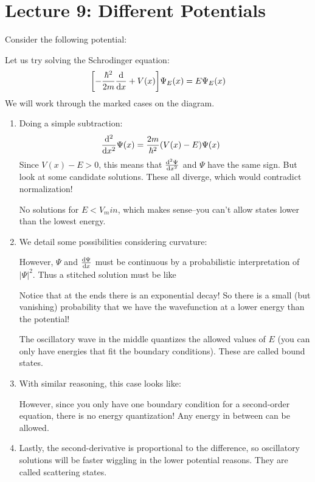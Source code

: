 \section{Lecture 9: Different Potentials}

Consider the following potential:


Let us try solving the Schrodinger equation:
\[ \qty[-\frac{\hbar^2}{2m} \derivative{}{x} + V(x)] \Psi_E(x) = E \Psi_E(x) \]
We will work through the marked cases on the diagram.
\begin{enumerate}
    \item Doing a simple subtraction:
    \begin{align*}
        \derivative{^2}{x^2} \Psi(x) &= \frac{2m}{\hbar^2} (V(x) - E) \Psi(x)
    \end{align*}
    Since $V(x) - E > 0$, this means that $\derivative{^2\Psi}{x^2}$ and $\Psi$ have the same sign. But look at some candidate solutions. These
    all diverge, which would contradict normalization!
    

    No solutions for $E < V_min$, which makes sense--you can't allow states lower than the lowest energy.
    \item We detail some possibilities considering curvature:
    

    However, $\Psi$ and $\derivative{\Psi}{x}$ must be continuous by a probabilistic interpretation of $|\Psi|^2$. Thus a stitched solution must
    be like 


    Notice that at the ends there is an exponential decay! So there is a small (but vanishing) probability that
    we have the wavefunction at a lower energy than the potential!

    The oscillatory wave in the middle quantizes the allowed values of $E$ (you can only have energies that fit the boundary conditions). These are called bound states.

    \item With similar reasoning, this case looks like:
    

    However, since you only have one boundary condition for a second-order equation, there is no energy quantization! Any energy in between can be allowed.

    \item Lastly, the second-derivative is proportional to the difference, so oscillatory solutions will be faster wiggling in the lower potential reasons. They are called scattering states.
\end{enumerate}

